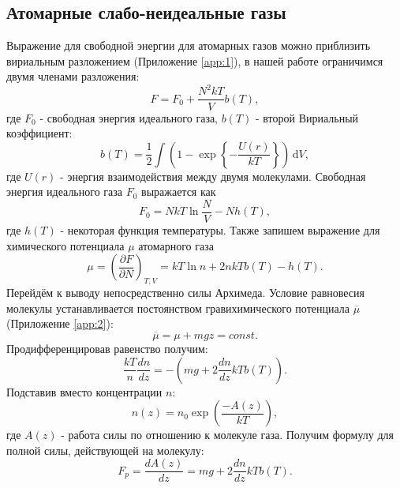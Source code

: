 \documentclass[12pt]{article}
\begin{document}
\subsection*{Атомарные слабо-неидеальные газы}
Выражение для свободной энергии для атомарных газов можно приблизить вириальным разложением (Приложение \ref{app:1}), 
в нашей работе ограничимся двумя членами разложения: 
\begin{equation}
    F = F_0 + \frac{N^{2}kT}{V} b(T),
    \label{eq:3}
\end{equation} 
где $F_0$ - свободная энергия идеального газа, $b(T)$ - второй Вириальный коэффициент: 
\begin{equation}
    b(T) = \frac{1}{2} \int \left( 1 - \exp \left\{ -\frac{U(r)}{kT} \right\}  \right)  \,\mathrm{d}V,
    \label{eq:4}
\end{equation}  
где $U(r)$ - энергия взаимодействия между двумя молекулами. 
Свободная энергия идеального газа $F_0$ выражается как 
\begin{equation}
    F_0 = NkT \ln \frac{N}{V} - N h(T), 
    \label{eq:5}
\end{equation} 
где $h(T)$ - некоторая функция температуры. 
Также запишем выражение для химического потенциала $\mu$  атомарного газа 
\begin{equation}
    \mu = \left( \frac{\partial F}{\partial N} \right)_{T, V} = kT \ln n + 2nkT b(T) - h(T).
    \label{eq:6}
\end{equation}
Перейдём к выводу непосредственно силы Архимеда. Условие равновесия молекулы устанавливается 
постоянством гравихимического потенциала $\overline{\mu}$ (Приложение \ref{app:2}):
\begin{equation}
    \overline{\mu} = \mu + mgz = const.
    \label{eq:7}
\end{equation}
Продифференцировав равенство получим: 
\begin{equation}
    \frac{kT}{n} \frac{dn}{dz} = -\left( mg + 2 \frac{dn}{dz} kT b(T) \right). 
    \label{eq:8}
\end{equation}
Подставив вместо концентрации $n$: 
\begin{equation}
    n(z) = n_0 \exp \left( \frac{-A(z)}{kT} \right), 
    \label{eq:9}
\end{equation} 
где $A(z)$ - работа силы по отношению к молекуле газа. Получим формулу для полной силы, действующей 
на молекулу: 
\begin{equation}
    F_p = \frac{dA(z)}{dz} = mg + 2 \frac{dn}{dz} kT b(T).
    \label{eq:10}
\end{equation} 
\end{document}
